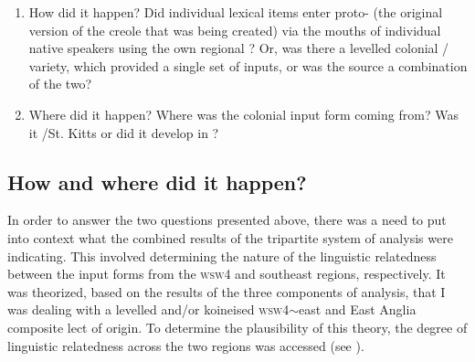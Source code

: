 \begin{enumerate}
\item{How did it happen? Did individual lexical items enter proto- (the original version of the  creole that was being created) via the mouths of individual native  speakers using the own regional ? Or, was there a levelled colonial / variety, which provided a single set of inputs, or was the source a combination
of the two?}
\item{Where did it happen? Where was the colonial  input form coming from? Was it /St. Kitts or did it develop in ?}
\end{enumerate}

\subsection{How and where did it happen?}\label{7.2.1}
In order to answer the two questions presented above, there was a need to put into context what the combined results of the tripartite system of analysis were indicating. This involved determining the nature of the linguistic relatedness between the input forms from the \textsc{wsw4} and southeast regions, respectively. It was theorized, based on the results of the three components of analysis, that I was dealing with a levelled and/or koineised \textsc{wsw4}$\sim$east and East Anglia composite lect of origin. To determine the plausibility of this theory, the degree of linguistic relatedness across the two regions was accessed (see ).


